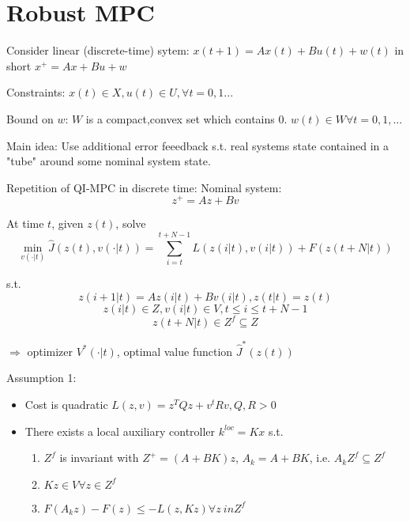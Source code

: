 \section{Robust MPC}

Consider linear (discrete-time) sytem:
$x(t+1) = Ax(t) + Bu(t) + w(t)$
in short $x^+=Ax+Bu+w$

Constraints: $x(t) \in X, u(t) \in U, \forall t = 0,1...$

Bound on $w$:
$W$ is a compact,convex set which contains $0$. $w(t) \in W \forall t =0,1,...$

Main idea:
Use additional error feeedback s.t. real systems state contained in a "tube" around some nominal system state.

Repetition of QI-MPC in discrete time:
Nominal system:
\begin{equation*}
z^+ = Az+Bv
\end{equation*}

At time $t$, given $z(t)$, solve 
\begin{equation*}
\min_{v(\cdot | t)} \hat J(z(t),v(\cdot|t)) = \sum_{i=t}^{t+N-1}L(z(i|t),v(i|t)) + F(z(t+N|t))
\end{equation*} 

s.t. 
\begin{equation*}
z(i+1|t) = Az(i|t)+Bv(i|t), z(t|t) = z(t)
\end{equation*}
\begin{equation*}
z(i|t) \in Z, v(i|t) \in V, t \leq i \leq t+N-1
\end{equation*}
\begin{equation*}
z(t+N|t) \in Z^f \subseteq Z
\end{equation*}

$\Rightarrow$ optimizer $V^*(\cdot|t)$, optimal value function $\hat J^*(z(t))$

Assumption 1:
\begin{itemize}
\item Cost is quadratic $L(z,v) = z^TQz + v^tRv, Q,R > 0$
\item There exists a local auxiliary controller $k^{loc} = Kx$ s.t.
\begin{enumerate}
\item $Z^f$ is invariant with $Z^+=(A+BK)z$, $A_k = A+BK$, i.e. $A_kZ^f \subseteq Z^f$
\item $Kz \in V \forall z \in Z^f$
\item $F(A_kz)-F(z) \leq - L(z,Kz) \forall z \ in Z^f$
\end{enumerate}
\end{itemize}

